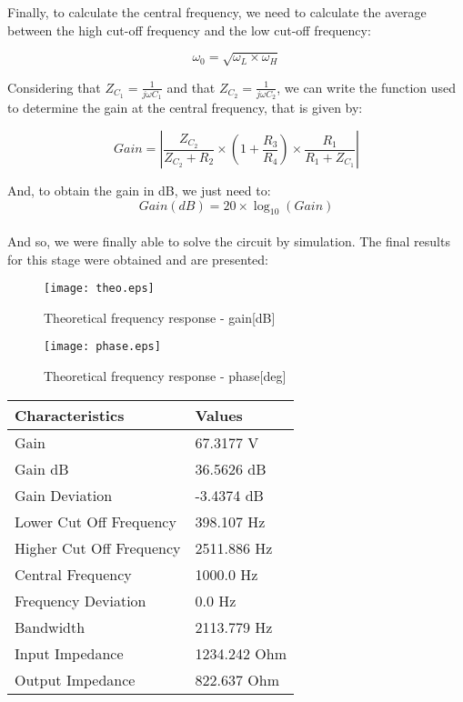 Finally, to calculate the central frequency, we need to calculate the average between the high cut-off frequency and the low cut-off frequency:

\[
\omega_{0}=\sqrt{\omega_{L} \times \omega_{H}}
\]


Considering that $Z_{C_1} = \frac{1}{j \omega C_1}$ and that $Z_{C_2} = \frac{1}{j \omega C_2}$, we can write the function used to determine the gain at the central frequency, that is given by:

\[
Gain = \displaystyle\left\lvert \frac{Z_{C_2}}{Z_{C_2}+R_2} \times (1+\frac{R_3}{R_4}) \times \frac{R_1}{R_1+Z_{C_1}} \right\rvert
\]

And, to obtain the gain in dB, we just need to:
\[
Gain (dB) = 20 \times \log_{10} (Gain)
\]

\paragraph{}And so, we were finally able to solve the circuit by simulation. The final results for this stage were obtained and are presented:

\begin{figure}[H] \centering
	\texttt{[image: theo.eps]}
	\caption{Theoretical frequency response - gain[dB]}
	\label{fig:gain_theo}
\end{figure}

\begin{figure}[H] \centering
	\texttt{[image: phase.eps]}
	\caption{Theoretical frequency response - phase[deg]}
	\label{fig:phase_theo}
\end{figure}

\begin{table}[H]
\centering
\begin{tabular}{|l|l|} 
\hline
\textbf{Characteristics} & \textbf{Values}  \\ \hline
Gain & 67.3177 V \\ \hline 
Gain dB & 36.5626 dB \\ \hline 
Gain Deviation & -3.4374 dB \\ \hline 
Lower Cut Off Frequency & 398.107 Hz \\ \hline 
Higher Cut Off Frequency & 2511.886 Hz \\ \hline 
Central Frequency & 1000.0 Hz \\ \hline 
Frequency Deviation & 0.0 Hz \\ \hline 
Bandwidth & 2113.779 Hz \\ \hline 
Input Impedance & 1234.242 Ohm \\ \hline 
Output Impedance & 822.637 Ohm \\ \hline 
\end{tabular}
\end{table}

